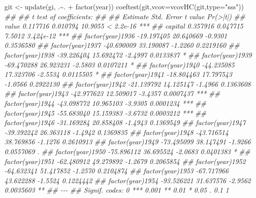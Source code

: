\documentclass[
  letterpaper,
  xelatex,
  ja=standard, xelatex]{bxjsbook}
\newenvironment{Shaded}{\begin{snugshade}}{\end{snugshade}}
\newcommand{\AttributeTok}[1]{\textcolor[rgb]{0.40,0.45,0.13}{#1}}
\newcommand{\DocumentationTok}[1]{\textcolor[rgb]{0.37,0.37,0.37}{\textit{#1}}}
\newcommand{\FunctionTok}[1]{\textcolor[rgb]{0.28,0.35,0.67}{#1}}
\newcommand{\NormalTok}[1]{\textcolor[rgb]{0.00,0.23,0.31}{#1}}
\newcommand{\OtherTok}[1]{\textcolor[rgb]{0.00,0.23,0.31}{#1}}
\newcommand{\SpecialCharTok}[1]{\textcolor[rgb]{0.37,0.37,0.37}{#1}}
\newcommand{\StringTok}[1]{\textcolor[rgb]{0.13,0.47,0.30}{#1}}
\begin{document}
\begin{Shaded}
\begin{Highlighting}[]
\NormalTok{git }\OtherTok{\textless{}{-}} \FunctionTok{update}\NormalTok{(gi, .}\SpecialCharTok{\textasciitilde{}}\NormalTok{. }\SpecialCharTok{+} \FunctionTok{factor}\NormalTok{(year))}
\FunctionTok{coeftest}\NormalTok{(git,}\AttributeTok{vcov=}\FunctionTok{vcovHC}\NormalTok{(git,}\AttributeTok{type=}\StringTok{"sss"}\NormalTok{))}
\DocumentationTok{\#\# }
\DocumentationTok{\#\# t test of coefficients:}
\DocumentationTok{\#\# }
\DocumentationTok{\#\#                    Estimate Std. Error t value  Pr(\textgreater{}|t|)    }
\DocumentationTok{\#\# value              0.117716   0.010794 10.9055 \textless{} 2.2e{-}16 ***}
\DocumentationTok{\#\# capital            0.357916   0.047715  7.5012 3.424e{-}12 ***}
\DocumentationTok{\#\# factor(year)1936 {-}19.197405  20.640669 {-}0.9301 0.3536580    }
\DocumentationTok{\#\# factor(year)1937 {-}40.690009  33.190087 {-}1.2260 0.2219160    }
\DocumentationTok{\#\# factor(year)1938 {-}39.226404  15.692472 {-}2.4997 0.0133837 *  }
\DocumentationTok{\#\# factor(year)1939 {-}69.470288  26.923231 {-}2.5803 0.0107211 *  }
\DocumentationTok{\#\# factor(year)1940 {-}44.235085  17.323706 {-}2.5534 0.0115505 *  }
\DocumentationTok{\#\# factor(year)1941 {-}18.804463  17.797543 {-}1.0566 0.2922130    }
\DocumentationTok{\#\# factor(year)1942 {-}21.139792  14.125147 {-}1.4966 0.1363608    }
\DocumentationTok{\#\# factor(year)1943 {-}42.977623  12.509017 {-}3.4357 0.0007437 ***}
\DocumentationTok{\#\# factor(year)1944 {-}43.098772  10.965103 {-}3.9305 0.0001234 ***}
\DocumentationTok{\#\# factor(year)1945 {-}55.683040  15.159383 {-}3.6732 0.0003212 ***}
\DocumentationTok{\#\# factor(year)1946 {-}31.169284  20.858408 {-}1.4943 0.1369549    }
\DocumentationTok{\#\# factor(year)1947 {-}39.392242  26.363118 {-}1.4942 0.1369835    }
\DocumentationTok{\#\# factor(year)1948 {-}43.716514  38.769856 {-}1.1276 0.2610913    }
\DocumentationTok{\#\# factor(year)1949 {-}73.495099  38.147491 {-}1.9266 0.0557069 .  }
\DocumentationTok{\#\# factor(year)1950 {-}75.896112  36.695524 {-}2.0683 0.0401383 *  }
\DocumentationTok{\#\# factor(year)1951 {-}62.480912  49.279892 {-}1.2679 0.2065854    }
\DocumentationTok{\#\# factor(year)1952 {-}64.632341  51.417852 {-}1.2570 0.2104874    }
\DocumentationTok{\#\# factor(year)1953 {-}67.717966  43.622288 {-}1.5524 0.1224442    }
\DocumentationTok{\#\# factor(year)1954 {-}93.526221  31.637576 {-}2.9562 0.0035603 ** }
\DocumentationTok{\#\# {-}{-}{-}}
\DocumentationTok{\#\# Signif. codes:  0 \textquotesingle{}***\textquotesingle{} 0.001 \textquotesingle{}**\textquotesingle{} 0.01 \textquotesingle{}*\textquotesingle{} 0.05 \textquotesingle{}.\textquotesingle{} 0.1 \textquotesingle{} \textquotesingle{} 1}
\end{Highlighting}
\end{Shaded}
\end{document}
